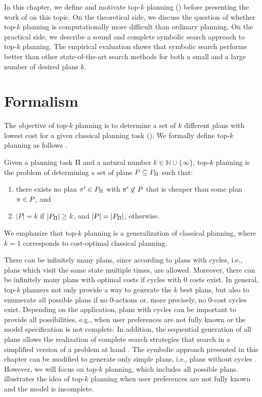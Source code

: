 In this chapter, we define and motivate top-$k$ planning () before presenting the work of \textcite{speck-et-al-aaai2020} on this topic.
On the theoretical side, we discuss the question of whether top-$k$ planning is computationally more difficult than ordinary planning.
On the practical side, we describe a sound and complete symbolic search approach to top-$k$ planning.
The empirical evaluation shows that symbolic search performs better than other state-of-the-art search methods for both a small and a large number of desired plans $k$.

\section{Formalism}

The objective of top-$k$ planning is to determine a set of $k$ different plans with lowest cost for a given classical planning task ().
We formally define top-$k$ planning as follows \autocite{riabov-et-al-icaps2014wsspark,katz-et-al-icaps2018,speck-et-al-aaai2020}.

\begin{definition}\label{def:top-k-planning}
    Given a planning task $\Pi$ and a natural number $k \in \mathbb{N} \cup \{ \infty \}$, top-$k$ planning is the problem of determining a set of plans $P \subseteq P_\Pi$ such that:
    \begin{enumerate}
        \item there exists no plan $\pi' \in P_\Pi$ with $\pi' \not\in P$ that is cheaper than some plan $\pi \in P$, and
        \item $|P| = k$ if $|P_\Pi| \geq k$, and $|P| = |P_\Pi{}|$, otherwise.
    \end{enumerate}
\end{definition}

We emphasize that top-$k$ planning is a generalization of classical planning, where $k=1$ corresponds to cost-optimal classical planning.


There can be infinitely many plans, since according to  plans with cycles, i.e., plans which visit the same state multiple times, are allowed.
Moreover, there can be infinitely many plans with optimal costs if cycles with $0$ costs exist.
In general, top-$k$ planners not only provide a way to generate the $k$ best plans, but also to enumerate all possible plans if no $0$-actions or, more precisely, no $0$-cost cycles exist.
Depending on the application, plans with cycles can be important to provide all possibilities, e.g., when user preferences are not fully known or the model specification is not complete.
In addition, the sequential generation of all plans allows the realization of complete search strategies that search in a simplified version of a problem at hand \autocite{hoeller-icaps2021}.
The symbolic approach presented in this chapter can be modified to generate only simple plans, i.e., plans without cycles \autocite{vontschammer-et-al-icaps2022}.
However, we will focus on  top-$k$ planning, which includes all possible plans.
 illustrates the idea of top-$k$ planning when user preferences are not fully known and the model is incomplete.

